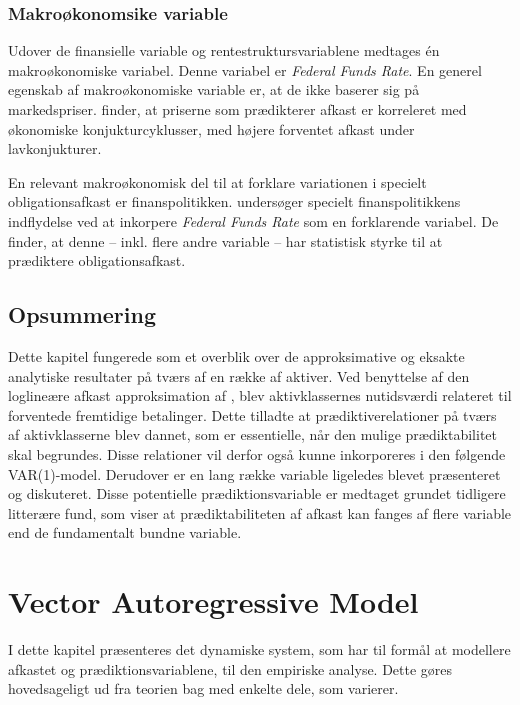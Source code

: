 \documentclass[
  a4paper,
  oneside]{memoir}
\begin{document}
\hypertarget{makrouxf8konomsike-variable}{%
\subsection{Makroøkonomsike variable}\label{makrouxf8konomsike-variable}}

Udover de finansielle variable og rentestruktursvariablene medtages én makroøkonomiske variabel. Denne variabel er \emph{Federal Funds Rate}. En generel egenskab af makroøkonomiske variable er, at de ikke baserer sig på markedspriser. \citep{Cochrane2008} finder, at priserne som prædikterer afkast er korreleret med økonomiske konjukturcyklusser, med højere forventet afkast under lavkonjukturer.

En relevant makroøkonomisk del til at forklare variationen i specielt obligationsafkast er finanspolitikken. \citep{Dai2005} undersøger specielt finanspolitikkens indflydelse ved at inkorpere \emph{Federal Funds Rate} som en forklarende variabel. De finder, at denne -- inkl. flere andre variable -- har statistisk styrke til at prædiktere obligationsafkast.

\hypertarget{opsafkrel}{%
\section{Opsummering}\label{opsafkrel}}

Dette kapitel fungerede som et overblik over de approksimative og eksakte analytiske resultater på tværs af en række af aktiver. Ved benyttelse af den loglineære afkast approksimation af \citep{Campbell1988}, blev aktivklassernes nutidsværdi relateret til forventede fremtidige betalinger. Dette tilladte at prædiktiverelationer på tværs af aktivklasserne blev dannet, som er essentielle, når den mulige prædiktabilitet skal begrundes. Disse relationer vil derfor også kunne inkorporeres i den følgende VAR(1)-model. Derudover er en lang række variable ligeledes blevet præsenteret og diskuteret. Disse potentielle prædiktionsvariable er medtaget grundet tidligere litterære fund, som viser at prædiktabiliteten af afkast kan fanges af flere variable end de fundamentalt bundne variable.

\hypertarget{varkapitel}{%
\chapter{Vector Autoregressive Model}\label{varkapitel}}

I dette kapitel præsenteres det dynamiske system, som har til formål at modellere afkastet og prædiktionsvariablene, til den empiriske analyse. Dette gøres hovedsageligt ud fra teorien bag \citep{Userguide2004} med enkelte dele, som varierer.
\end{document}
